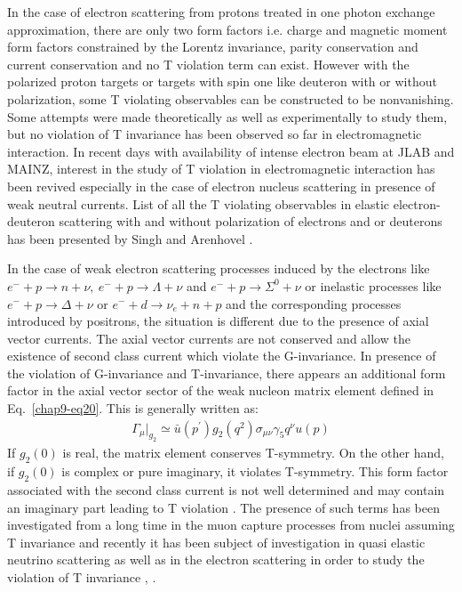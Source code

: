 In the case of electron scattering from protons treated in one photon exchange approximation, there are only two form factors i.e. charge and magnetic moment form factors constrained by the Lorentz invariance, parity conservation and current conservation and no T violation term can exist. However with the polarized proton targets or targets with spin one like deuteron with or without polarization, some T violating observables can be constructed to be nonvanishing. Some attempts were made theoretically as well as experimentally  to study them, but no violation of T invariance has been observed so far in electromagnetic interaction. In recent days with availability of intense electron beam at JLAB and MAINZ, interest in the study of T violation in electromagnetic interaction has been revived especially in the case of electron nucleus scattering in presence of weak neutral currents. List of all the T violating observables in elastic electron-deuteron scattering with and without polarization of electrons and or deuterons has been presented by Singh and Arenhovel \cite{key11}.

 In the case of weak electron scattering processes induced by the electrons like  $e^-+p\rightarrow n+\nu,~ e^-+p\rightarrow\Lambda+\nu$ and $e^-+p\rightarrow \Sigma^0+\nu$ or inelastic processes like $e^-+p\rightarrow \Delta+\nu$ or $e^-+d\rightarrow \nu_e+n+p$ and the corresponding processes introduced by positrons, the situation is different due to the presence of axial vector currents. The axial vector currents are not conserved and allow the existence of second class current which violate the G-invariance. In presence of the violation of G-invariance and T-invariance, there appears an additional form factor in the axial vector sector of the weak nucleon matrix element defined in Eq.~\ref{chap9-eq20}. This is generally written as: 
 \setcounter{equation}{39}
 \begin{align}
   \Gamma_\mu|_{g_2} \simeq  \bar u(p^\prime) g_2(q^2) \sigma_{\mu \nu} \gamma_5 q^\nu u(p) \label{chap9-eq40}
 \end{align}
 If $g_2(0)$ is real, the matrix element conserves T-symmetry. 
On the other hand, if  $g_2(0)$ is complex or pure imaginary, it violates T-symmetry. 
 This form factor associated with the second class current is not well determined and may contain an imaginary part leading to T violation \cite{key16}. The presence of such terms has been investigated from a long time in the muon capture processes from nuclei assuming T invariance and recently it has been subject of investigation in quasi elastic neutrino scattering as well as in the electron scattering in order to study the violation of T invariance \cite{key14}, \cite{key15}.
 
